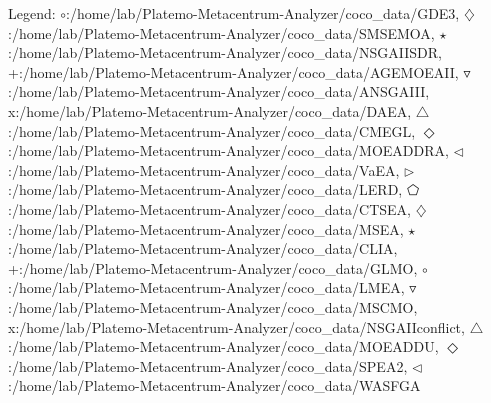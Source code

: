 Legend: {\color{CornflowerBlue}$\circ$}:/home/lab/Platemo-Metacentrum-Analyzer/coco\_data/GDE3, {{}$\diamondsuit$}:/home/lab/Platemo-Metacentrum-Analyzer/coco\_data/SMSEMOA, {\color{Green}$\star$}:/home/lab/Platemo-Metacentrum-Analyzer/coco\_data/NSGAIISDR, {\color{red}+}:/home/lab/Platemo-Metacentrum-Analyzer/coco\_data/AGEMOEAII, {\color{brown}$\triangledown$}:/home/lab/Platemo-Metacentrum-Analyzer/coco\_data/ANSGAIII, {{}x}:/home/lab/Platemo-Metacentrum-Analyzer/coco\_data/DAEA, {{}$\triangle$}:/home/lab/Platemo-Metacentrum-Analyzer/coco\_data/CMEGL, {{}$\Diamond$}:/home/lab/Platemo-Metacentrum-Analyzer/coco\_data/MOEADDRA, {{}$\triangleleft$}:/home/lab/Platemo-Metacentrum-Analyzer/coco\_data/VaEA, {{}$\triangleright$}:/home/lab/Platemo-Metacentrum-Analyzer/coco\_data/LERD, {{}$\pentagon$}:/home/lab/Platemo-Metacentrum-Analyzer/coco\_data/CTSEA, {{}$\diamondsuit$}:/home/lab/Platemo-Metacentrum-Analyzer/coco\_data/MSEA, {{}$\star$}:/home/lab/Platemo-Metacentrum-Analyzer/coco\_data/CLIA, {{}+}:/home/lab/Platemo-Metacentrum-Analyzer/coco\_data/GLMO, {{}$\circ$}:/home/lab/Platemo-Metacentrum-Analyzer/coco\_data/LMEA, {{}$\triangledown$}:/home/lab/Platemo-Metacentrum-Analyzer/coco\_data/MSCMO, {{}x}:/home/lab/Platemo-Metacentrum-Analyzer/coco\_data/NSGAIIconflict, {{}$\triangle$}:/home/lab/Platemo-Metacentrum-Analyzer/coco\_data/MOEADDU, {{}$\Diamond$}:/home/lab/Platemo-Metacentrum-Analyzer/coco\_data/SPEA2, {{}$\triangleleft$}:/home/lab/Platemo-Metacentrum-Analyzer/coco\_data/WASFGA
